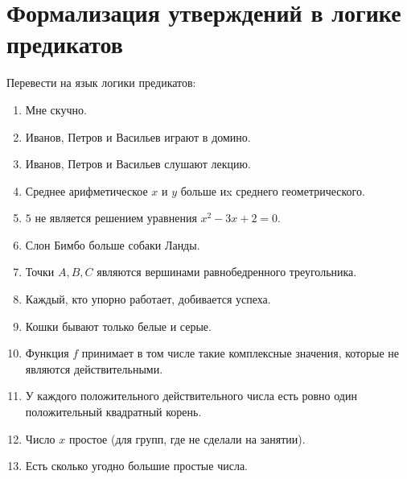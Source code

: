 \documentclass{article}
\begin{document}
\section{Формализация утверждений в логике предикатов}
Перевести на язык логики предикатов:
\begin{enumerate}
    \item Мне скучно.
    \item Иванов, Петров и Васильев играют в домино.
    \item Иванов, Петров и Васильев слушают лекцию.
    \item Среднее арифметическое $x$ и $y$ больше иx среднего геометрического.
    \item $5$ не является решением уравнения $x^2 - 3x + 2 = 0$.
    \item Слон Бимбо больше собаки Ланды.
    \item Точки $A, B, C$ являются вершинами равнобедренного треугольника.
    \item Каждый, кто упорно работает, добивается успеха.
    \item Кошки бывают только белые и серые.
    \item Функция $f$ принимает в том числе такие комплексные значения, которые не являются действительными.
    \item У каждого положительного действительного числа есть ровно один положительный квадратный корень.
    \item Число $x$ простое (для групп, где не сделали на занятии).
    \item Есть сколько угодно большие простые числа.
\end{enumerate}
\end{document}
